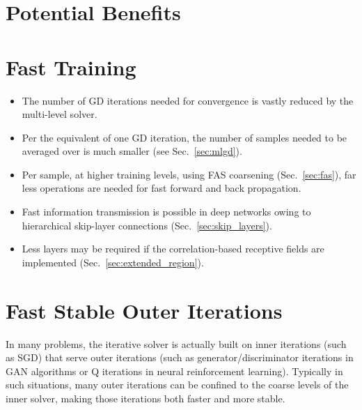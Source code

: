 \documentclass{article} %
\begin{document}

\newpage
\section{Potential Benefits}
\label{sec:benefits}

\section{Fast Training}
\label{sec:fast_training}
\begin{itemize}
\item The number of GD iterations needed for convergence is vastly reduced by the multi-level solver.
\item Per the equivalent of one GD iteration, the number of samples needed to be averaged over is much smaller (see Sec.~\ref{sec:mlgd}).
\item Per sample, at higher training levels, using FAS coarsening (Sec.~\ref{sec:fas}), far less operations are needed for fast forward and back propagation.
\item Fast information transmission is possible in deep networks owing to hierarchical skip-layer connections (Sec.~\ref{sec:skip_layers}).
\item Less layers may be required if the correlation-based receptive fields are implemented (Sec.~\ref{sec:extended_region}).
\end{itemize}

\section{Fast Stable Outer Iterations}
\label{sec:out_iteration}
In many problems, the iterative solver is actually built on inner iterations (such as SGD) that serve outer iterations (such as generator/discriminator iterations in GAN algorithms or Q iterations in neural reinforcement learning). Typically in such situations, many outer iterations can be confined to the coarse levels of the inner solver, making those iterations both faster and more stable.
\end{document}
